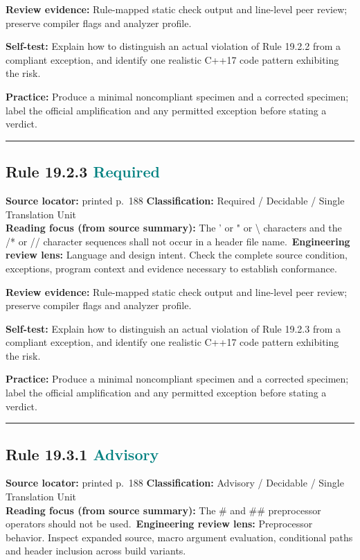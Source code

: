 \documentclass[10pt,letterpaper]{article}
\begin{document}
\textbf{Review evidence:} Rule-mapped static check output and line-level peer review; preserve compiler flags and analyzer profile.

\textbf{Self-test:} Explain how to distinguish an actual violation of Rule 19.2.2 from a compliant exception, and identify one realistic C++17 code pattern exhibiting the risk.\par
\textbf{Practice:} Produce a minimal noncompliant specimen and a corrected specimen; label the official amplification and any permitted exception before stating a verdict.
\smallskip\hrule\smallskip
\subsection*{Rule 19.2.3 \enspace \texorpdfstring{\small\textcolor{teal}{Required}}{Required}}
\noindent\textbf{Source locator:} printed p.~188 \quad\textbf{Classification:} Required / Decidable / Single Translation Unit\\
\textbf{Reading focus (from source summary):} The ' or " or \textbackslash{} characters and the /* or // character sequences shall not occur in a header file name.\
\textbf{Engineering review lens:} Language and design intent. Check the complete source condition, exceptions, program context and evidence necessary to establish conformance.

\textbf{Review evidence:} Rule-mapped static check output and line-level peer review; preserve compiler flags and analyzer profile.

\textbf{Self-test:} Explain how to distinguish an actual violation of Rule 19.2.3 from a compliant exception, and identify one realistic C++17 code pattern exhibiting the risk.\par
\textbf{Practice:} Produce a minimal noncompliant specimen and a corrected specimen; label the official amplification and any permitted exception before stating a verdict.
\smallskip\hrule\smallskip
\subsection*{Rule 19.3.1 \enspace \texorpdfstring{\small\textcolor{teal}{Advisory}}{Advisory}}
\noindent\textbf{Source locator:} printed p.~188 \quad\textbf{Classification:} Advisory / Decidable / Single Translation Unit\\
\textbf{Reading focus (from source summary):} The \# and \#\# preprocessor operators should not be used.\
\textbf{Engineering review lens:} Preprocessor behavior. Inspect expanded source, macro argument evaluation, conditional paths and header inclusion across build variants.
\end{document}
